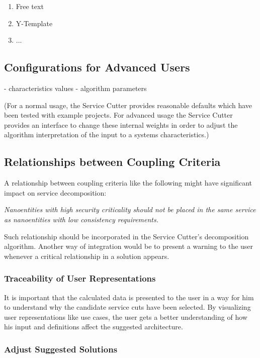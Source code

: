 \begin{enumerate}
	\item Free text
	\item Y-Template\cite{y-template}
	\item ...
\end{enumerate}

\subsection{Configurations for Advanced Users}

- characteristics values
- algorithm parameters

(For a normal usage, the Service Cutter provides reasonable defaults which have been tested with example projects. For advanced usage the Service Cutter provides an interface to change these internal weights in order to adjust the algorithm interpretation of the input to a systems characteristics.) 


\subsection{Relationships between Coupling Criteria}

A relationship between coupling criteria like the following might have significant impact on service decomposition:

\textit{Nanoentities with high security criticality should not be placed in the same service as nanoentities with low consistency requirements.}

Such relationship should be incorporated in the Service Cutter's decomposition algorithm. Another way of integration would be to present a warning to the user whenever a critical relationship in a solution appears.


\subsubsection{Traceability of User Representations}

It is important that the calculated data is presented to the user in a way for him to understand why the candidate service cuts have been selected. By visualizing user representations like use cases, the user gets a better understanding of how his input and definitions affect the suggested architecture. 

\subsubsection{Adjust Suggested Solutions}

